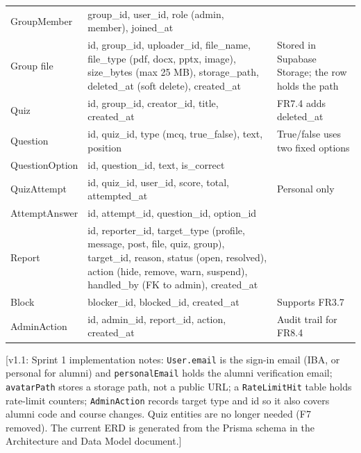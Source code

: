 \documentclass[10pt,a4paper]{article}
\newcommand{\vone}[1]{\textcolor{accent}{\small[v1.1: #1]}}
\begin{document}
{\begin{longtable}{@{}p{24mm} >{\raggedright\arraybackslash}p{78mm} >{\raggedright\arraybackslash}p{48mm}@{}}
GroupMember & group\_id, user\_id, role (admin, member), joined\_at & \\
Group file & id, group\_id, uploader\_id, file\_name, file\_type (pdf, docx, pptx, image), size\_bytes (max 25 MB), storage\_path, deleted\_at (soft delete), created\_at & Stored in Supabase Storage; the row holds the path\\
Quiz & id, group\_id, creator\_id, title, created\_at & FR7.4 adds deleted\_at\\
Question & id, quiz\_id, type (mcq, true\_false), text, position & True/false uses two fixed options\\
QuestionOption & id, question\_id, text, is\_correct & \\
QuizAttempt & id, quiz\_id, user\_id, score, total, attempted\_at & Personal only\\
AttemptAnswer & id, attempt\_id, question\_id, option\_id & \\
Report & id, reporter\_id, target\_type (profile, message, post, file, quiz, group), target\_id, reason, status (open, resolved), action (hide, remove, warn, suspend), handled\_by (FK to admin), created\_at & \\
Block & blocker\_id, blocked\_id, created\_at & Supports FR3.7\\
AdminAction & id, admin\_id, report\_id, action, created\_at & Audit trail for FR8.4\\
\bottomrule
\end{longtable}}

\vone{Sprint 1 implementation notes: \texttt{User.email} is the sign-in email (IBA, or personal for alumni) and \texttt{personalEmail} holds the alumni verification email; \texttt{avatarPath} stores a storage path, not a public URL; a \texttt{RateLimitHit} table holds rate-limit counters; \texttt{AdminAction} records target type and id so it also covers alumni code and course changes. Quiz entities are no longer needed (F7 removed). The current ERD is generated from the Prisma schema in the Architecture and Data Model document.}
\end{document}
